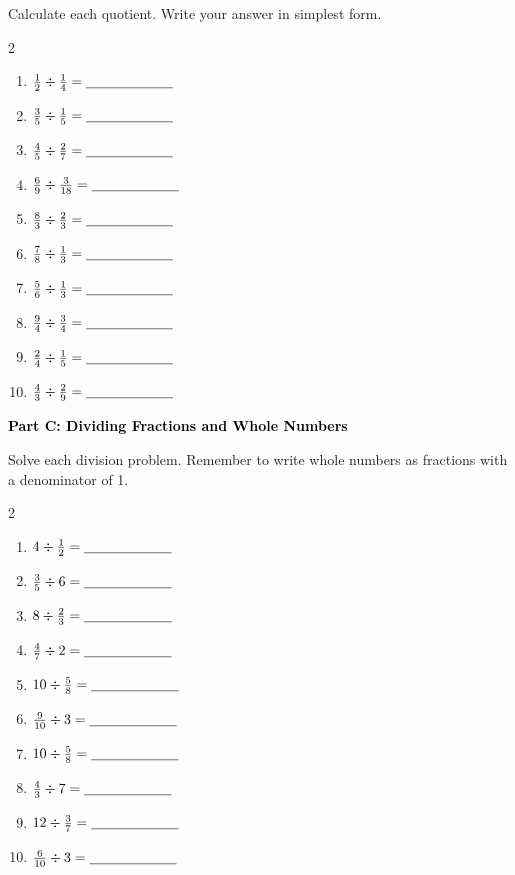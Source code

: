 \documentclass[12pt, letterpaper, fleqn]{article}
\newcommand{\blank}{\underline{\hspace{2.2cm}}}
\begin{document}
\vspace{3mm}
\noindent
Calculate each quotient. Write your answer in simplest form.

\vspace{5mm}
\begin{multicols}{2}
\begin{enumerate}[itemsep=3cm, leftmargin=0.6cm]
\item $\frac{1}{2} \div \frac{1}{4} = \blank$
\item $\frac{3}{5} \div \frac{1}{5} = \blank$
\item $\frac{4}{5} \div \frac{2}{7} = \blank$
\item $\frac{6}{9} \div \frac{3}{18} = \blank$
\item $\frac{8}{3} \div \frac{2}{3} = \blank$
\item $\frac{7}{8} \div \frac{1}{3} = \blank$
\item $\frac{5}{6} \div \frac{1}{3} = \blank$
\item $\frac{9}{4} \div \frac{3}{4} = \blank$
\item $\frac{2}{4} \div \frac{1}{5} = \blank$
\item $\frac{4}{3} \div \frac{2}{9} = \blank$
\end{enumerate}
\end{multicols}
\newpage

\begin{tcolorbox}[colback=black!10]
    \large\textcolor{black}{\textbf{Part C: Dividing Fractions and Whole Numbers}}
\end{tcolorbox}

\vspace{3mm}
\noindent
Solve each division problem. Remember to write whole numbers as fractions with a denominator of 1.

\vspace{5mm}
\begin{multicols}{2}
\begin{enumerate}[itemsep=3cm, leftmargin=0.6cm]
\item $4 \div \frac{1}{2} = \blank$
\item $\frac{3}{5} \div 6 = \blank$
\item $8 \div \frac{2}{3} = \blank$
\item $\frac{4}{7} \div 2 = \blank$
\item $10 \div \frac{5}{8} = \blank$
\item $\frac{9}{10} \div 3 = \blank$
\item $10 \div \frac{5}{8} = \blank$
\item $\frac{4}{3} \div 7 = \blank$
\item $12 \div \frac{3}{7} = \blank$
\item $\frac{6}{10} \div 3 = \blank$
\end{enumerate}
\end{multicols}
\newpage
\end{document}
